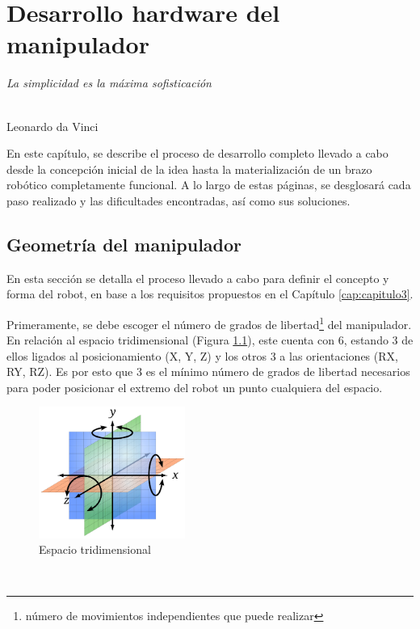\chapter{Desarrollo hardware del manipulador}
\label{cap:capitulo5}
\begin{flushright}
  \begin{minipage}[]{10cm}
  \emph{La simplicidad es la máxima sofisticación}\\
  \end{minipage}\\
  Leonardo da Vinci\\
  \end{flushright}

\vspace{1cm}

\noindent En este capítulo, se describe el proceso de desarrollo completo llevado a cabo desde la concepción inicial de la 
idea hasta la materialización de un brazo robótico completamente funcional. A lo largo de estas páginas, se desglosará cada 
paso realizado y las dificultades encontradas, así como sus soluciones. 
\section{Geometría del manipulador}
\label{sec:eligiendo_geometría}
\noindent En esta sección se detalla el proceso llevado a cabo para definir el concepto y forma del robot, en base a 
los requisitos propuestos en el Capítulo \ref{cap:capitulo3}. 

Primeramente, se debe escoger el número de grados de libertad\footnote{número de movimientos independientes que puede realizar} del manipulador. 
En relación al espacio tridimensional (Figura \ref{fig:espacio_tridimensional}), este cuenta con 6, estando 3 de ellos ligados al 
posicionamiento (X, Y, Z) y los otros 3 a las orientaciones (RX, RY, RZ). Es por esto que 3 es el mínimo número de grados de libertad necesarios 
para poder posicionar el extremo del robot un punto cualquiera del espacio.

\begin{figure} [ht!]
  \begin{center}
    \includegraphics[width=4.8cm]{figs/coordinates.png}
  \end{center}
  \caption{Espacio tridimensional}
  \label{fig:espacio_tridimensional}
\end{figure}\ 

